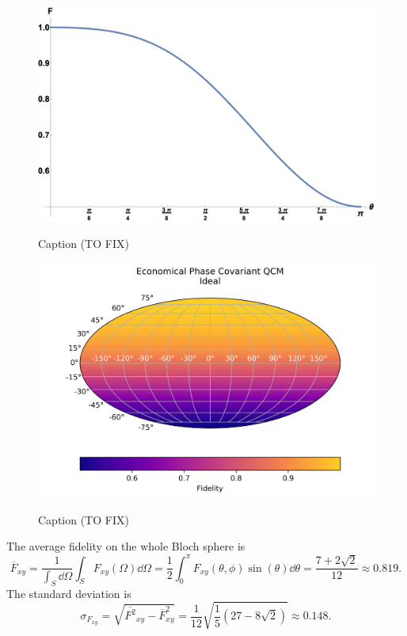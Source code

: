 \begin{figure}[H]
    \begin{minipage}{.5\textwidth}
        \centering
        \includegraphics[width=\textwidth]{Figures/plot_1D_economical_phase_covariant.png}
        \label{fig:economical_phase_covariant_rotated_1d}
        \caption{Caption (TO FIX)}
      \end{minipage}%
      \begin{minipage}{.5\textwidth}
        \centering
        \includegraphics[width=\textwidth]{Figures/economical_phase_covariant_rotated.png}
        \label{fig:economical_phase_covariant_rotated}
        \caption{Caption (TO FIX)}
      \end{minipage}
    \end{figure}
The average fidelity on the whole Bloch sphere is
\begin{equation}
    \overline{F}_{xy}=\frac{1}{\int_S \dd{\Omega}}\int_S F_{xy}(\Omega)\dd{\Omega}=\frac{1}{2}\int_0^\pi F_{xy}(\theta,\phi)\sin(\theta)\dd{\theta}=\frac{7+2\sqrt{2}}{12}\approx 0.819.
    \label{eqn:avg_fidelity_epcqcm}
\end{equation}
The standard deviation is
\begin{equation}
    \sigma_{{F}_{xy}}=\sqrt{\overline{F^2}_{xy}-\overline{F}^2_{xy}}
    =\frac{1}{12} \sqrt{\frac{1}{5} \left(27-8 \sqrt{2}\right)}\approx 0.148.
    \label{eqn:std_fidelity_epcqcm}
\end{equation}

